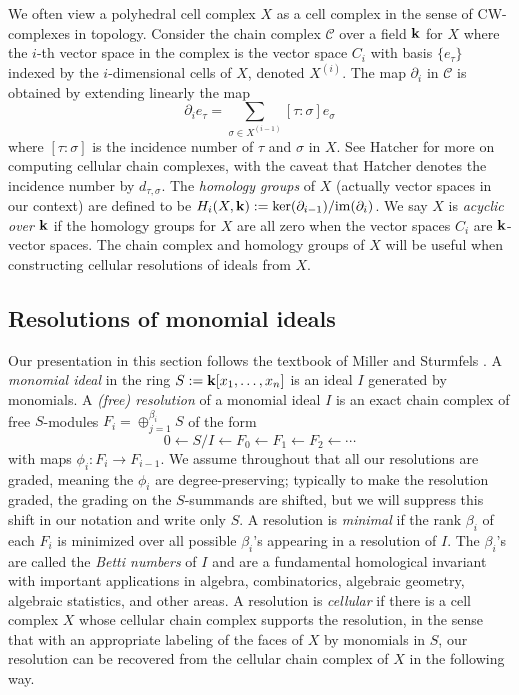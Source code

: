 \documentclass[11pt]{amsart}
\theoremstyle{definition}
\numberwithin{equation}{section}
\theoremstyle{remark}
\numberwithin{equation}{section}
\begin{document}
We often view a polyhedral cell complex $X$ as a cell complex in the sense of CW-complexes in topology.
Consider the chain complex ${\mathcal{C}}$ over a field ${{\bf k}}$ for $X$ where the $i$-th vector space in the complex is the vector space $C_i$ with basis $\{e_\tau\}$ indexed by the $i$-dimensional cells of $X$, denoted $X^{(i)}$.
The map $\partial_i$ in ${\mathcal{C}}$ is obtained by extending linearly the map 
\[\partial_ie_\tau = \sum_{\sigma\in X^{(i-1)}}[\tau:\sigma]e_{\sigma}\]
where $[\tau:\sigma]$ is the incidence number of $\tau$ and $\sigma$ in $X$.  
See Hatcher \cite[Chapter 2]{Hatcher} for more on computing cellular chain complexes, with the caveat that Hatcher denotes the incidence number by $d_{\tau,\sigma}$.
The \emph{homology groups} of $X$ (actually vector spaces in our context) are defined to be $H_i(X,{{\bf k}}):=\ker(\partial_{i-1})/{\mathrm{im}}(\partial_i)$.  
We say $X$ is \emph{acyclic over ${{\bf k}}$} if the homology groups for $X$ are all zero when the vector spaces $C_i$ are ${{\bf k}}$-vector spaces.
The chain complex and homology groups of $X$ will be useful when constructing cellular resolutions of ideals from $X$.

\subsection{Resolutions of monomial ideals}

Our presentation in this section follows the textbook of Miller and Sturmfels \cite{MillerSturmfels}.
A \emph{monomial ideal} in the ring $S:={{\bf k}}[x_1,\ldots,x_n]$ is an ideal $I$ generated by monomials.
A \emph{(free) resolution} of a monomial ideal $I$ is an exact chain complex of free $S$-modules $\displaystyle F_i=\oplus_{j=1}^{\beta_i}S$ of the form
\[0\leftarrow S/I \leftarrow F_0 \leftarrow F_1 \leftarrow F_2 \leftarrow \cdots
\]
with maps $\phi_i:F_i\rightarrow F_{i-1}$.
We assume throughout that all our resolutions are graded, meaning the $\phi_i$ are degree-preserving; typically to make the resolution graded, the grading on the $S$-summands are shifted, but we will suppress this shift in our notation and write only $S$.
A resolution is \emph{minimal} if the rank $\beta_i$ of each $F_i$ is minimized over all possible $\beta_i$'s appearing in a resolution of $I$.
The $\beta_i$'s are called the \emph{Betti numbers} of $I$ and are a fundamental homological invariant with important applications in algebra, combinatorics, algebraic geometry, algebraic statistics, and other areas.
A resolution is \emph{cellular} if there is a cell complex $X$ whose cellular chain complex supports the resolution, in the sense that with an appropriate labeling of the faces of $X$ by monomials in $S$, our resolution can be recovered from the cellular chain complex of $X$ in the following way.
\end{document}
